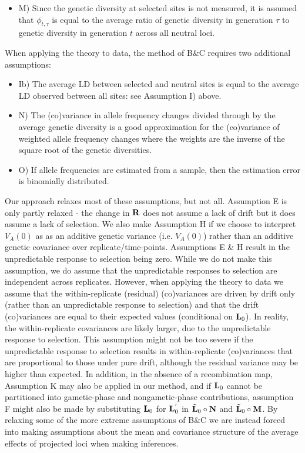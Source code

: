 \documentclass[12pt]{article}
\begin{document}
\begin{bibunit}
\begin{itemize}
\item M) Since the genetic diversity at selected sites is not measured, it is assumed that $\phi_{t,\tau}$ is equal to the average ratio of genetic diversity in generation $\tau$ to genetic diversity in generation $t$ across all neutral loci.
\end{itemize}

When applying the theory to data, the method of B\&C requires two additional assumptions:

\begin{itemize}

\item Ib) The average LD between selected and neutral sites is equal to the average LD observed between all sites: see Assumption I) above.

\item N) The (co)variance in allele frequency changes divided through by the average genetic diversity is a good approximation for the (co)variance of weighted allele frequency changes where the weights are the inverse of the square root of the genetic diversities. 

\item O) If allele frequencies are estimated from a sample, then the estimation error is binomially distributed.
\end{itemize}

Our approach relaxes most of these assumptions, but not all. Assumption E is only partly relaxed - the change in ${\bf R}$ does not assume a lack of drift but it does assume a lack of selection. We also make Assumption H if we choose to interpret $V_{\bar A}(0)$ as as an additive genetic variance (i.e. $V_{A}(0)$) rather than an additive genetic covariance over replicate/time-points. Assumptions E \& H result in the unpredictable response to selection being zero. While we do not make this assumption, we do assume that the unpredictable responses to selection are independent across replicates. However, when applying the theory to data we assume that the within-replicate (residual) (co)variances are driven by drift only (rather than an unpredictable response to selection) and that the drift (co)variances are equal to their expected values (conditional on ${\bf L}_0$). In reality, the within-replicate covariances are likely larger, due to the unpredictable response to selection. This assumption might not be too severe if the unpredictable response to selection results in within-replicate (co)variances that are proportional to those under pure drift, although the residual variance may be higher than expected. In addition, in the absence of a recombination map, Assumption K may also be applied in our method, and if ${\bf L}_0$ cannot be partitioned into gametic-phase and nongametic-phase contributions, assumption F might also be made by substituting ${\bf L}_0$ for ${\bf L}^{'}_0$ in $\tilde{\bf L}_0\circ{\bf N}$ and $\tilde{\bf L}_0\circ{\bf M}$. By relaxing some of the more extreme assumptions of B\&C we are instead forced into making assumptions about the mean and covariance structure of the average effects of projected loci when making inferences. 



\end{bibunit}
\end{document}
